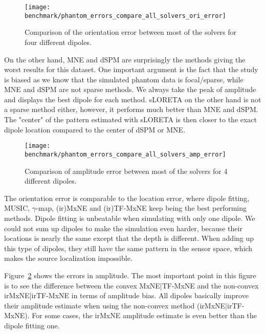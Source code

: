 \begin{figure}[h!]
	\centering 
    \texttt{[image: benchmark/phantom\_errors\_compare\_all\_solvers\_ori\_error]}
    \caption{Comparison of the orientation error between most of the solvers for four different dipoles. \label{fig:all_solvers_ori_error}}
\end{figure}

On the other hand, MNE and dSPM are surprisingly the methods giving the worst results for this dataset. One important argument is the fact that the study is biased as we know that the simulated phantom data is focal/sparse, while MNE and dSPM are not sparse methods. We always take the peak of amplitude and displays the best dipole for each method. sLORETA on the other hand is not a sparse method either, however, it performs much better than MNE and dSPM. The "center" of the pattern estimated with sLORETA is then closer to the exact dipole location compared to the center of dSPM or MNE.

\begin{figure}[h!]
	\texttt{[image: benchmark/phantom\_errors\_compare\_all\_solvers\_amp\_error]}
	\caption{Comparison of amplitude error between most of the solvers for 4 different dipoles.\label{fig:all_solvers_amp_error}}
\end{figure}

The orientation error is comparable to the location error, where dipole fitting, MUSIC, $\gamma$-map, (ir)MxNE and (ir)TF-MxNE keep being the best performing methods. Dipole fitting is unbeatable when simulating with only one dipole. We could not sum up dipoles to make the simulation even harder, because their locations is nearly the same except that the depth is different. When adding up this type of dipoles, they still have the same pattern in the sensor space, which makes the source localization impossible.

Figure~\ref{fig:all_solvers_amp_error} shows the errors in amplitude. The most important point in this figure is to see the difference between the convex MxNE|TF-MxNE and the non-convex irMxNE|irTF-MxNE in terms of amplitude bias. All dipoles basically improve their amplitude estimate when using the non-convex method (irMxNE|irTF-MxNE). For some cases, the irMxNE amplitude estimate is even better than the dipole fitting one.

